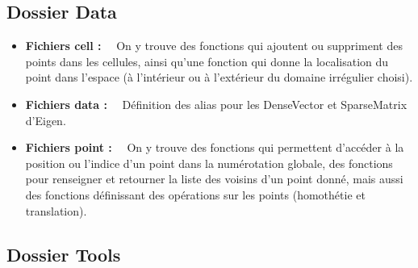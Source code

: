 \documentclass[12pt]{article}
\begin{document}
\vspace{2 mm}

\subsection{Dossier Data}

\noindent
\begin{itemize}
	\item \textbf{Fichiers cell :}~~ On y trouve des fonctions qui ajoutent ou suppriment des points dans les cellules, ainsi qu'une fonction qui donne la localisation du point dans l'espace (à l'intérieur ou à l'extérieur du domaine irrégulier choisi).

\vspace{5 mm}

	\item \textbf{Fichiers data :}~~ Définition des alias pour les DenseVector et SparseMatrix d'Eigen.
	
\vspace{5 mm}
	
	\item \textbf{Fichiers point :}~~ On y trouve des fonctions qui permettent d'accéder à la position ou l'indice d'un point dans la numérotation globale, des fonctions pour renseigner et retourner la liste des voisins d'un point donné, mais aussi des fonctions définissant des opérations sur les points (homothétie et translation).
\end{itemize}

\vspace{2 mm}

\subsection{Dossier Tools}
\end{document}
